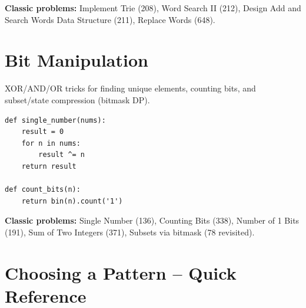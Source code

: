 \documentclass[11pt]{article}
\begin{document}
\textbf{Classic problems:} Implement Trie (208), Word Search II (212),
Design Add and Search Words Data Structure (211), Replace Words (648).

\section{Bit Manipulation}

XOR/AND/OR tricks for finding unique elements, counting bits, and
subset/state compression (bitmask DP).

\begin{lstlisting}
def single_number(nums):
    result = 0
    for n in nums:
        result ^= n
    return result

def count_bits(n):
    return bin(n).count('1')
\end{lstlisting}

\textbf{Classic problems:} Single Number (136), Counting Bits (338),
Number of 1 Bits (191), Sum of Two Integers (371), Subsets via bitmask
(78 revisited).

\section{Choosing a Pattern -- Quick Reference}
\end{document}
